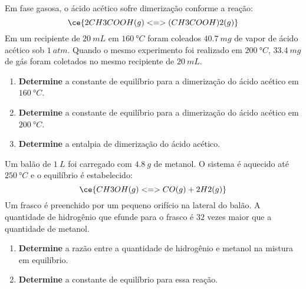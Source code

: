 \begin{problem}[
	id={2F50},
	path={/home/braun/Documents/Developer/braunchem/data/problems/Q2/2F/2F50}
]
Em fase gasosa, o ácido acético sofre dimerização conforme a reação: {\[
    \ce{ 2 CH3COOH(g) <=> (CH3COOH)2(g) }
\]} Em um recipiente de {\(\qty{20}{\unit{mL}}\)} em {\(\qty{160}{\unit{\degree C}}\)} foram coleados {\(\qty{40,7}{\unit{mg}}\)} de vapor de ácido
acético sob {\(\qty{1}{\unit{atm}}\)}. Quando o mesmo experimento foi realizado em {\(\qty{200}{\unit{\degree C}}\)}, {\(\qty{33,4}{\unit{mg}}\)} de
gás foram coletados no mesmo recipiente de {\(\qty{20}{\unit{mL}}\)}.

\begin{enumerate}
\def\labelenumi{\alph{enumi}.}
\tightlist
\item
  \textbf{Determine} a constante de equilíbrio para a dimerização do ácido acético em {\(\qty{160}{\unit{\degree C}}\)}.
\item
  \textbf{Determine} a constante de equilíbrio para a dimerização do ácido acético em {\(\qty{200}{\unit{\degree C}}\)}.
\item
  \textbf{Determine} a entalpia de dimerização do ácido acético.
\end{enumerate}

\end{problem}


\begin{problem}[
	id={2F51},
	path={/home/braun/Documents/Developer/braunchem/data/problems/Q2/2F/2F51}
]
Um balão de {\(\qty{1}{\unit{L}}\)} foi carregado com {\(\qty{4,8}{\unit{g}}\)} de metanol. O sistema é aquecido até {\(\qty{250}{\unit{\degree C}}\)}
e o equilíbrio é estabelecido: {\[
    \ce{ CH3OH(g) <=> CO(g) + 2 H2(g) }
\]} Um frasco é preenchido por um pequeno orifício na lateral do balão. A quantidade de hidrogênio que efunde para o frasco é {\(\num{32}\)} vezes
maior que a quantidade de metanol.

\begin{enumerate}
\def\labelenumi{\alph{enumi}.}
\tightlist
\item
  \textbf{Determine} a razão entre a quantidade de hidrogênio e metanol na mistura em equilíbrio.
\item
  \textbf{Determine} a constante de equilíbrio para essa reação.
\end{enumerate}

\end{problem}


